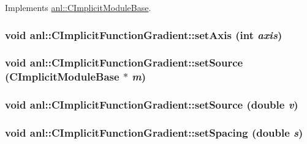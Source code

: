 Implements \hyperlink{classanl_1_1CImplicitModuleBase_ab88f8a1822dcfbc13ba5230318b0acd1}{anl::CImplicitModuleBase}.\hypertarget{classanl_1_1CImplicitFunctionGradient_a7e98e47172df7bf0147011f33a9b14b9}{
\subsubsection[{setAxis}]{\setlength{\rightskip}{0pt plus 5cm}void anl::CImplicitFunctionGradient::setAxis (int {\em axis})}}
\label{classanl_1_1CImplicitFunctionGradient_a7e98e47172df7bf0147011f33a9b14b9}
\hypertarget{classanl_1_1CImplicitFunctionGradient_a6a62ce2609113a5f782536fa6dc82f04}{
\subsubsection[{setSource}]{\setlength{\rightskip}{0pt plus 5cm}void anl::CImplicitFunctionGradient::setSource ({\bf CImplicitModuleBase} $\ast$ {\em m})}}
\label{classanl_1_1CImplicitFunctionGradient_a6a62ce2609113a5f782536fa6dc82f04}
\hypertarget{classanl_1_1CImplicitFunctionGradient_a7a9bd61935b3ed907438b3ce36417b82}{
\subsubsection[{setSource}]{\setlength{\rightskip}{0pt plus 5cm}void anl::CImplicitFunctionGradient::setSource (double {\em v})}}
\label{classanl_1_1CImplicitFunctionGradient_a7a9bd61935b3ed907438b3ce36417b82}
\hypertarget{classanl_1_1CImplicitFunctionGradient_a055fd8a37ba7e686b67b65671f78edd8}{
\subsubsection[{setSpacing}]{\setlength{\rightskip}{0pt plus 5cm}void anl::CImplicitFunctionGradient::setSpacing (double {\em s})}}
\label{classanl_1_1CImplicitFunctionGradient_a055fd8a37ba7e686b67b65671f78edd8}


